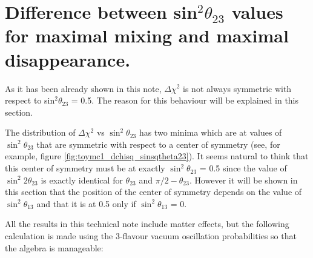 \clearpage

\section {Difference between sin$^{2}\theta_{23}$  values for maximal mixing and maximal disappearance.}
\label{app:symmetry}


As it has been already shown in this note,  $\Delta\chi^2$ is not always symmetric with respect to sin$^{2}\theta_{23}$ = 0.5. 
The reason for this behaviour will be explained in this section. 

The distribution of $\Delta\chi^{2}$ vs $\sin^{2}\theta_{23}$ has two minima which are at values of $\sin^{2}\theta_{23}$ that are symmetric 
with respect to a center of symmetry (see, for example, figure \ref{fig:toymc1_dchisq_sinsqtheta23}). It seems natural to think that 
this center of symmetry must be at exactly $\sin^{2}\theta_{23}$ = 0.5 since the value of $\sin^{2}2\theta_{23}$ is exactly identical for 
$\theta_{23}$ and $\pi/2-\theta_{23}$. However it will be shown in this section that the position of the center of symmetry depends on the value 
of $\sin^{2}\theta_{13}$ and that it is at 0.5 only if $\sin^{2}\theta_{13}$ = 0. 

All the results in this technical note include matter effects, but the following calculation is made using the 3-flavour vacuum oscillation 
probabilities so that the algebra is manageable:




